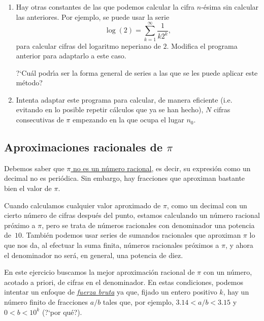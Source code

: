 \
 
 \bigskip
 
 \
 
 
\begin{ejer}

\begin{enumerate}
 \item Hay otras constantes de las que podemos calcular la cifra $n$-\'esima sin
calcular las anteriores. Por ejemplo, se puede usar la serie
 \[\log(2)=\sum_{k=1}^{\infty} \frac{1}{k2^k},\]
 para calcular cifras del logaritmo neperiano de $2$. Modifica el programa
anterior para adaptarlo a este caso.
 
 ?`Cu\'al podr\'{\i}a ser la forma general de series a las que se les puede
aplicar este m\'etodo?
 
 \item Intenta adaptar este programa para calcular, de manera eficiente (i.e.
evitando en lo posible repetir c\'alculos que ya se han hecho),  
 $N$ cifras consecutivas de $\pi$ empezando en la que ocupa el lugar $n_0$. 
 \end{enumerate}
\end{ejer}




\subsection{Aproximaciones racionales de $\pi$}

Debemos saber que \href{http://150.244.21.37/PDFs/APROX/pi-irracional.pdf}{$\pi$ no es un
n\'umero racional}, es decir, su
expresi\'on como un decimal no es peri\'odica. Sin embargo, hay fracciones que
aproximan bastante bien el valor de $\pi$.

Cuando calculamos cualquier valor aproximado de  $\pi$, como un decimal con un
cierto n\'umero de cifras despu\'es del punto,  estamos calculando un n\'umero
racional pr\'oximo a $\pi$, pero se trata de n\'umeros racionales con
denominador
una potencia de~$10$. Tambi\'en podemos usar series de sumandos racionales que
aproximan $\pi$ lo que nos da, al efectuar la suma finita, n\'umeros racionales
pr\'oximos a $\pi$, y ahora el denominador  no ser\'a, en general,  una potencia
de diez.

En este ejercicio buscamos la mejor aproximaci\'on racional de $\pi$ con un
n\'umero, acotado a priori, de cifras en el denominador. En estas condiciones,
podemos intentar un enfoque de \hyperref[bruta]{\itshape fuerza bruta} ya que,
fijado un entero
positivo $k$,  hay un n\'umero finito de fracciones $a/b$ tales que, por
ejemplo,  $3{.}14<a/b<3{.}15$ y $0<b<10^k$ (?`por qu\'e?). 

